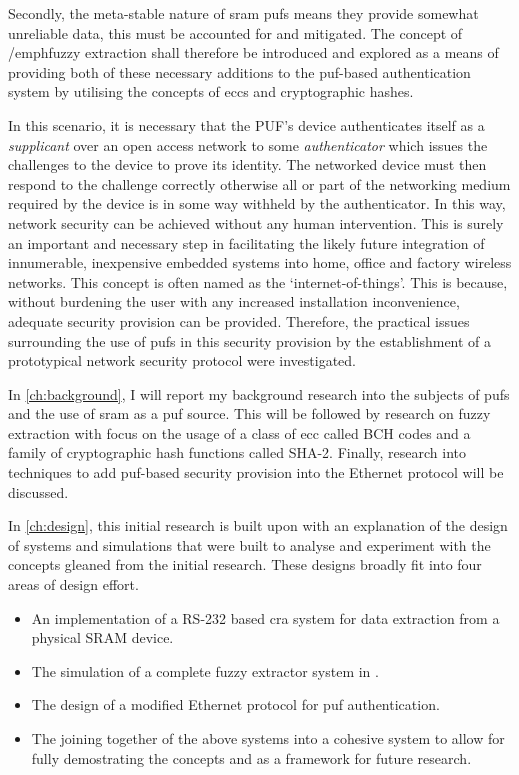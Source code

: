 Secondly, the meta-stable nature of \gls{sram} \glspl{puf} means they provide somewhat unreliable data,
this must be accounted for and mitigated.
The concept of /emph{fuzzy extraction}\cite{tuyls2007noisy} shall therefore be
introduced and explored as a means of providing both of these necessary additions to the
\gls{puf}-based authentication system by utilising the concepts of \glspl{ecc} and
cryptographic hashes.

In this scenario, it is necessary that the PUF's device authenticates
itself as a \emph{supplicant} over an open access network to some \emph{authenticator}
which issues the challenges to the device to prove its identity.
The networked device must then respond to the challenge correctly otherwise all
or part of the networking medium required by the device is in some way
withheld by the authenticator.
In this way, network security can be achieved without any human intervention.
This is surely an important and necessary step in facilitating the likely future
integration of innumerable, inexpensive embedded systems into home, office
and factory wireless networks. This concept is often named as the
`internet-of-things'\cite{ashton2009internet}.
This is because, without burdening the user with any increased installation
inconvenience, adequate security provision can be provided.
Therefore, the practical issues surrounding the use of \glspl{puf} in this security provision
by the establishment of a prototypical network security protocol were investigated.

In \autoref{ch:background}, I will report my background research into the
subjects of \glspl{puf} and the use of \gls{sram} as a \gls{puf} source.
This will be followed by research on fuzzy extraction with focus on the usage of a class of \gls{ecc}
called BCH codes and a family of cryptographic hash functions called SHA-2. Finally,
research into techniques to add \gls{puf}-based security provision into the
Ethernet protocol will be discussed.

In \autoref{ch:design}, this initial research is built upon with an explanation of
the design of systems and simulations that were built to analyse and experiment
with the concepts gleaned from the initial research. These designs broadly fit
into four areas of design effort.
\begin{itemize}
\item An implementation of a RS-232 based \gls{cra} system for data extraction from a
physical SRAM device.
\item The simulation of a complete fuzzy extractor system in \matlab.
\item The design of a modified Ethernet protocol for \gls{puf} authentication.
\item The joining together of the above systems into a cohesive system to allow for
fully demostrating the concepts and as a framework for future research.
\end{itemize}

